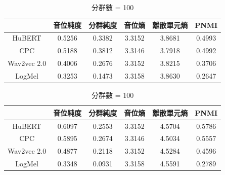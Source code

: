 {

\begin{table}[!htbp]
    \centering
    \begin{subtable}[t]{\textwidth}
        \centering
        \begin{tabular}{|c|c|c|c|c|c|} \hline
                        & 音位純度   & 分群純度   & 音位熵    & 離散單元熵  & PNMI   \\ \hline
            HuBERT      &     0.5256 &     0.3382 &    3.3152 &      3.8681 & 0.4993 \\ \hline    %
            CPC         &     0.5188 &     0.3812 &    3.3146 &      3.7918 & 0.4992 \\ \hline    %
            Wav2vec 2.0 &     0.4006 &     0.2676 &    3.3152 &      3.8215 & 0.3706 \\ \hline    %
            LogMel      &     0.3253 &     0.1473 &    3.3158 &      3.8630 & 0.2647 \\ \hline    %
        \end{tabular}
        \caption{分群數 = 50}
        \label{tab:ch3-clu050-phn}
    \end{subtable}

    \vspace{0.5cm}

    \begin{subtable}[t]{\textwidth}
        \centering
        \begin{tabular}{|c|c|c|c|c|c|} \hline
                        & 音位純度   & 分群純度   & 音位熵    & 離散單元熵  & PNMI   \\ \hline
            HuBERT      &     0.6097 &     0.2553 &    3.3152 &      4.5704 & 0.5786 \\ \hline    %
            CPC         &     0.5895 &     0.2674 &    3.3146 &      4.5034 & 0.5557 \\ \hline    %
            Wav2vec 2.0 &     0.4877 &     0.2118 &    3.3152 &      4.5284 & 0.4596 \\ \hline    %
            LogMel      &     0.3348 &     0.0931 &    3.3158 &      4.5591 & 0.2789 \\ \hline    %
        \end{tabular}
        \caption{分群數 = 100}
        \label{tab:ch3-clu100-phn}
    \end{subtable}

    \vspace{0.5cm}


\end{table}}
